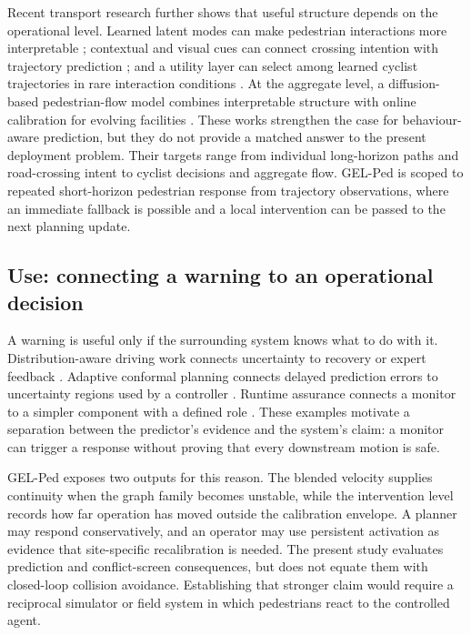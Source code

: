 Recent transport research further shows that useful structure depends on the operational level. Learned latent modes can make pedestrian interactions more interpretable \citep{liu2024}; contextual and visual cues can connect crossing intention with trajectory prediction \citep{munir2025}; and a utility layer can select among learned cyclist trajectories in rare interaction conditions \citep{li2023cyclist}. At the aggregate level, a diffusion-based pedestrian-flow model combines interpretable structure with online calibration for evolving facilities \citep{mai2025}. These works strengthen the case for behaviour-aware prediction, but they do not provide a matched answer to the present deployment problem. Their targets range from individual long-horizon paths and road-crossing intent to cyclist decisions and aggregate flow. GEL-Ped is scoped to repeated short-horizon pedestrian response from trajectory observations, where an immediate fallback is possible and a local intervention can be passed to the next planning update.

\subsection{Use: connecting a warning to an operational decision}

A warning is useful only if the surrounding system knows what to do with it. Distribution-aware driving work connects uncertainty to recovery or expert feedback \citep{filos2020distribution}. Adaptive conformal planning connects delayed prediction errors to uncertainty regions used by a controller \citep{dixit2023adaptive}. Runtime assurance connects a monitor to a simpler component with a defined role \citep{sha2001simplicity}. These examples motivate a separation between the predictor's evidence and the system's claim: a monitor can trigger a response without proving that every downstream motion is safe.

GEL-Ped exposes two outputs for this reason. The blended velocity supplies continuity when the graph family becomes unstable, while the intervention level records how far operation has moved outside the calibration envelope. A planner may respond conservatively, and an operator may use persistent activation as evidence that site-specific recalibration is needed. The present study evaluates prediction and conflict-screen consequences, but does not equate them with closed-loop collision avoidance. Establishing that stronger claim would require a reciprocal simulator or field system in which pedestrians react to the controlled agent.

